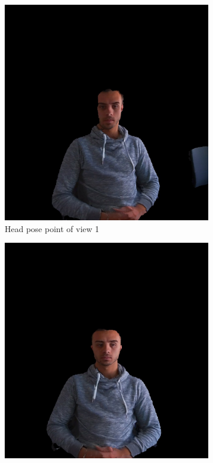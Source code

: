\begin{figure}[H]
\centering
  \begin{subfigure}[b]{0.32 \textwidth}
    \includegraphics[width=\textwidth]{images/scenario/00465_head.jpg}
    \caption{Head pose point of view 1}
    \label{figure:00465_head}
  \end{subfigure}
  \hfill
  \begin{subfigure}[b]{0.32 \textwidth}
    \includegraphics[width=\textwidth]{images/scenario/00267_head.jpg}

\end{subfigure}
\end{figure}
